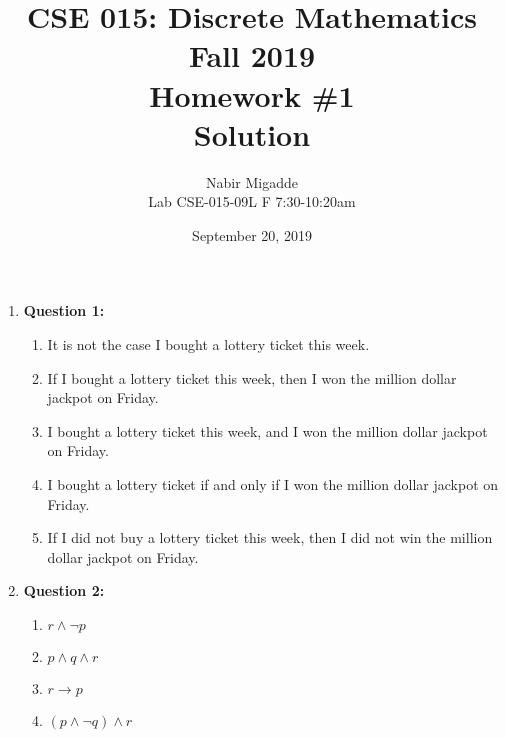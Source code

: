 \documentclass[11pt]{article}
\begin{document}
\author{Nabir Migadde\\
Lab CSE-015-09L F 7:30-10:20am}

\title{CSE 015: Discrete Mathematics\\
Fall 2019\\
Homework \#1\\
Solution}

\date{September 20, 2019}
\maketitle

\begin{enumerate}

\item
\textbf{Question 1:}

\begin{enumerate}[label=(\alph*)]
\item
It is not the case I bought a lottery ticket this week.

\item
If I bought a lottery ticket this week, then I won the million dollar jackpot on Friday.

\item
I bought a lottery ticket this week, and I won the million dollar jackpot on Friday.

\item
I bought a lottery ticket if and only if I won the million dollar jackpot on Friday.

\item
If I did not buy a lottery ticket this week, then I did not win the million dollar jackpot on Friday.

\end{enumerate}

\item
\textbf{Question 2:}

\begin{enumerate}[label=(\alph*)]
\item
$r \land \lnot p$

\item
$p \land q \land r$

\item
$r \rightarrow p$

\item
$(p \land \lnot q) \land r$


\end{enumerate}
\end{enumerate}
\end{document}
